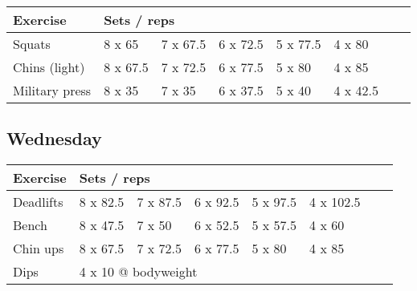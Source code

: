 \documentclass[12pt, a4paper]{article}%
\begin{document}
  \begin{tabular}{l|lllllll}
  \hspace{0.75em} \textbf{Exercise} & \multicolumn{ 7 }{l}{ \textbf{Sets / reps} } \\ \hline

            \hspace{0.75em} Squats
            & 8 x 65
            & 7 x 67.5
            & 6 x 72.5
            & 5 x 77.5
            & 4 x 80
            & 
            & 
            \\


            \hspace{0.75em} Chins (light)
            & 8 x 67.5
            & 7 x 72.5
            & 6 x 77.5
            & 5 x 80
            & 4 x 85
            & 
            & 
            \\


            \hspace{0.75em} Military press
            & 8 x 35
            & 7 x 35
            & 6 x 37.5
            & 5 x 40
            & 4 x 42.5
            & 
            & 
            \\


  \end{tabular}

  \subsection*{\hspace{0.5em} Wednesday }


  \begin{tabular}{l|lllllll}
  \hspace{0.75em} \textbf{Exercise} & \multicolumn{ 7 }{l}{ \textbf{Sets / reps} } \\ \hline

            \hspace{0.75em} Deadlifts
            & 8 x 82.5
            & 7 x 87.5
            & 6 x 92.5
            & 5 x 97.5
            & 4 x 102.5
            & 
            & 
            \\


            \hspace{0.75em} Bench
            & 8 x 47.5
            & 7 x 50
            & 6 x 52.5
            & 5 x 57.5
            & 4 x 60
            & 
            & 
            \\


            \hspace{0.75em} Chin ups
            & 8 x 67.5
            & 7 x 72.5
            & 6 x 77.5
            & 5 x 80
            & 4 x 85
            & 
            & 
            \\


   \hspace{0.75em} Dips &  \multicolumn{ 7 }{l}{ 4 x 10 @ bodyweight } \\
  \end{tabular}
\end{document}
